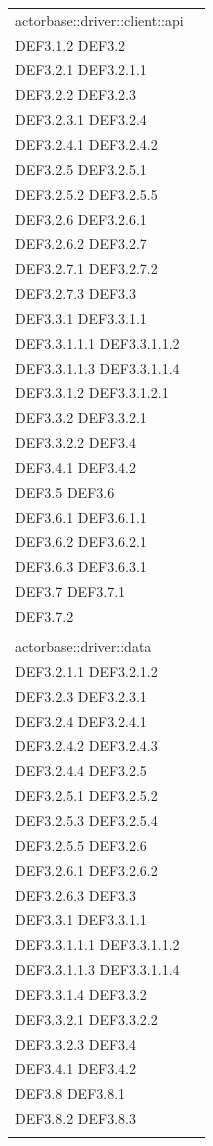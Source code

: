 \documentclass{scalatekids-article}
\begin{document}
\begin{longtable}[H]{|p{9cm}|p{8cm}|}
actorbase::driver::client::api & \multiLineCell[t]{DEF3.1 DEF3.1.1\\DEF3.1.2 DEF3.2\\DEF3.2.1 DEF3.2.1.1\\DEF3.2.2 DEF3.2.3\\DEF3.2.3.1 DEF3.2.4\\DEF3.2.4.1 DEF3.2.4.2\\DEF3.2.5 DEF3.2.5.1\\DEF3.2.5.2 DEF3.2.5.5\\DEF3.2.6 DEF3.2.6.1\\DEF3.2.6.2 DEF3.2.7\\DEF3.2.7.1 DEF3.2.7.2\\DEF3.2.7.3 DEF3.3\\DEF3.3.1 DEF3.3.1.1\\DEF3.3.1.1.1 DEF3.3.1.1.2\\DEF3.3.1.1.3 DEF3.3.1.1.4\\DEF3.3.1.2 DEF3.3.1.2.1\\DEF3.3.2 DEF3.3.2.1\\DEF3.3.2.2 DEF3.4\\DEF3.4.1 DEF3.4.2\\DEF3.5 DEF3.6\\DEF3.6.1 DEF3.6.1.1\\DEF3.6.2 DEF3.6.2.1\\DEF3.6.3 DEF3.6.3.1\\DEF3.7 DEF3.7.1\\DEF3.7.2\\}\\
\hline
actorbase::driver::data & \multiLineCell[t]{DEF3.2 DEF3.2.1\\DEF3.2.1.1 DEF3.2.1.2\\DEF3.2.3 DEF3.2.3.1\\DEF3.2.4 DEF3.2.4.1\\DEF3.2.4.2 DEF3.2.4.3\\DEF3.2.4.4 DEF3.2.5\\DEF3.2.5.1 DEF3.2.5.2\\DEF3.2.5.3 DEF3.2.5.4\\DEF3.2.5.5 DEF3.2.6\\DEF3.2.6.1 DEF3.2.6.2\\DEF3.2.6.3 DEF3.3\\DEF3.3.1 DEF3.3.1.1\\DEF3.3.1.1.1 DEF3.3.1.1.2\\DEF3.3.1.1.3 DEF3.3.1.1.4\\DEF3.3.1.4 DEF3.3.2\\DEF3.3.2.1 DEF3.3.2.2\\DEF3.3.2.3 DEF3.4\\DEF3.4.1 DEF3.4.2\\DEF3.8 DEF3.8.1\\DEF3.8.2 DEF3.8.3\\}\\

\end{longtable}
\end{document}
